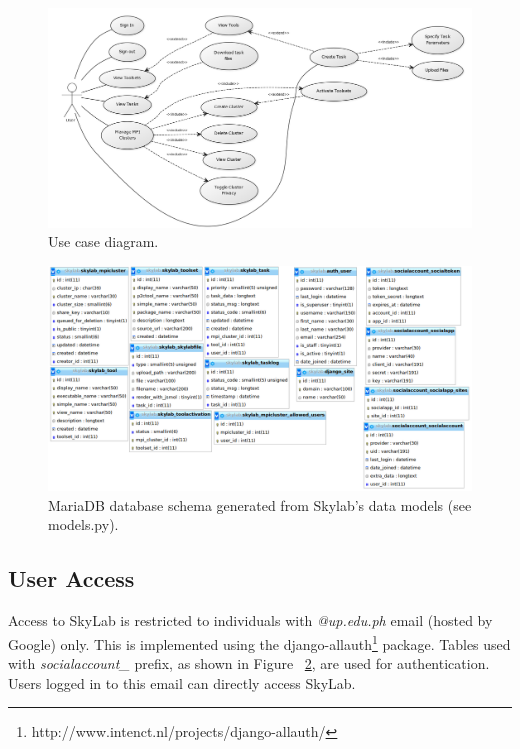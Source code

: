     \begin{figure}[ht]
      \centering
      \includegraphics[scale=0.36]{./images/use_case_large.png}
      \caption{\label{fig:usecase}Use case diagram.}
    \end{figure}

	\begin{figure}[ht]
      \centering
      \includegraphics[scale=1.5]{./images/db_schema.png}
      \caption{\label{fig:dbschema}MariaDB database schema generated from Skylab's data models (see models.py).}
    \end{figure}

\subsection{User Access}
Access to SkyLab is restricted to individuals with \textit{@up.edu.ph} email (hosted by Google) only. This is implemented  using the django-allauth\footnote{http://www.intenct.nl/projects/django-allauth/} package. Tables used with \textit{socialaccount\_} prefix, as shown in Figure ~\ref{fig:dbschema}, are used for authentication. Users logged in to this email can directly access SkyLab.

